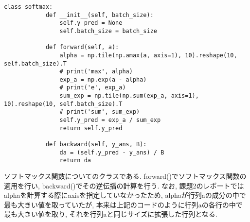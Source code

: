 \documentclass[a4j, titlepage]{jarticle}
\begin{document}
    \subsubsection*{}
        \begin{lstlisting}[caption=ソフトマックス関数の計算とその逆伝播,label=fuga]
        class softmax:
            def __init__(self, batch_size):
                self.y_pred = None
                self.batch_size = batch_size

            def forward(self, a):
                alpha = np.tile(np.amax(a, axis=1), 10).reshape(10, self.batch_size).T
                # print('max', alpha)
                exp_a = np.exp(a - alpha)
                # print('e', exp_a)
                sum_exp = np.tile(np.sum(exp_a, axis=1), 10).reshape(10, self.batch_size).T
                # print('sum', sum_exp)
                self.y_pred = exp_a / sum_exp
                return self.y_pred

            def backward(self, y_ans, B):
                da = (self.y_pred - y_ans) / B
                return da
        \end{lstlisting}
        ソフトマックス関数についてのクラスである.
        forward()でソフトマックス関数の適用を行い, backward()でその逆伝播の計算を行う.
        なお, 課題2のレポートではalphaを計算する際にaxisを指定していなかったため, alphaが行列aの成分の中で最も大きい値を取っていたが, 本来は上記のコードのように行列aの各行の中で最も大きい値を取り, それを行列aと同じサイズに拡張した行列となる.
\end{document}
